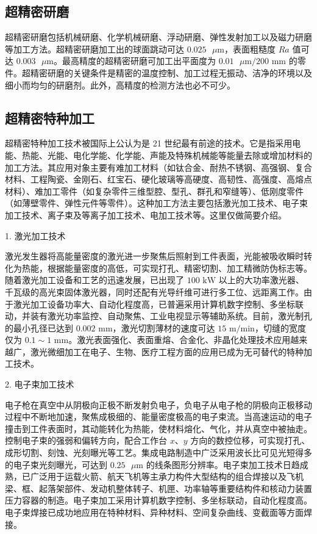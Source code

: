 \documentclass[UTF8]{ctexbook}
\newcommand{\◎}{\ensuremath{\bigcirc}}
\begin{document}
\subsection{超精密研磨}

超精密研磨包括机械研磨、化学机械研磨、浮动研磨、弹性发射加工以及磁力研磨等加工方法。超精密研磨加工出的球面跳动可达 $0.025\text{ }\mu\text{m}$，表面粗糙度 $Ra$ 值可达 $0.003\text{ }\mu\text{m}$。最高精度的超精密研磨可加工出平面度为 $0.01\text{ }\mu\text{m}/200\text{ mm}$ 的零件。超精密研磨的关键条件是精密的温度控制、加工过程无振动、洁净的环境以及细小而均匀的研磨剂。此外，高精度的检测方法也必不可少。

\subsection{超精密特种加工}

超精密特种加工技术被国际上公认为是 21 世纪最有前途的技术。它是指采用电能、热能、光能、电化学能、化学能、声能及特殊机械能等能量去除或增加材料的加工方法。其应用对象主要有难加工材料（如钛合金、耐热不锈钢、高强钢、复合材料、工程陶瓷、金刚石、红宝石、硬化玻璃等高硬度、高韧性、高强度、高熔点材料）、难加工零件（如复杂零件三维型腔、型孔、群孔和窄缝等）、低刚度零件（如薄壁零件、弹性元件等零件）。这种加工方法主要包括激光加工技术、电子束加工技术、离子束及等离子加工技术、电加工技术等。这里仅做简要介绍。

1. 激光加工技术

激光发生器将高能量密度的激光进一步聚焦后照射到工件表面，光能被吸收瞬时转化为热能，根据能量密度的高低，可实现打孔、精密切割、加工精微防伪标志等。随着激光加工设备和工艺的迅速发展，已出现了 $100\text{ kW}$ 以上的大功率激光器、千瓦级的高光束固体激光器，同时还配有光导纤维可进行多工位、远距离工作。由于激光加工设备功率大、自动化程度高，已普遍采用计算机数字控制、多坐标联动，并装有激光功率监控、自动聚焦、工业电视显示等辅助系统。目前，激光制孔的最小孔径已达到 $0.002\text{ mm}$，激光切割薄材的速度可达 $15\text{ m/min}$，切缝的宽度仅为 $0.1\sim1\text{ mm}$。激光表面强化、表面重熔、合金化、非晶化处理技术应用越来越广，激光微细加工在电子、生物、医疗工程方面的应用已成为无可替代的特种加工技术。

2. 电子束加工技术

电子枪在真空中从阴极向正极不断发射负电子，负电子从电子枪的阴极向正极移动过程中不断地加速，聚焦成极细的、能量密度极高的电子束流。当高速运动的电子撞击到工件表面时，其动能转化为热能，使材料熔化、气化，并从真空中被抽走。控制电子束的强弱和偏转方向，配合工作台 $x$、$y$ 方向的数控位移，可实现打孔、成形切割、刻蚀、光刻曝光等工艺。集成电路制造中广泛采用波长比可见光短得多的电子束光刻曝光，可达到 $0.25\text{ }\mu\text{m}$ 的线条图形分辨率。电子束加工技术日趋成熟，已广泛用于运载火箭、航天飞机等主承力构件大型结构的组合焊接以及飞机梁、框、起落架部件、发动机整体转子、机匣、功率轴等重要结构件和核动力装置压力容器的制造。电子束加工采用计算机数字控制、多坐标联动，自动化程度高。电子束焊接已成功地应用在特种材料、异种材料、空间复杂曲线、变截面等方面焊接。
\end{document}
